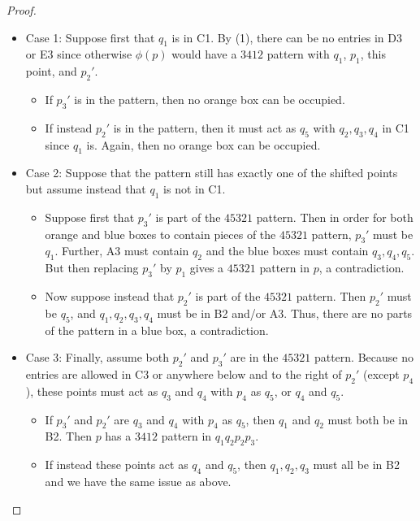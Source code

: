 \documentclass[10pt,a4paper]{amsart}
\begin{document}
\begin{proof}
    \begin{itemize}
        \item Case 1: Suppose first that $q_1$ is in C1. By (1), there can be no entries in D3 or E3 since otherwise $\phi(p)$ would have a $3412$ pattern with $q_1$, $p_1$, this point, and $p_2'$.
        \begin{itemize}
            \item If $p_3'$ is in the pattern, then no orange box can be occupied. 
            \item If instead $p_2'$ is in the pattern, then it must act as $q_5$ with $q_2, q_3,q_4$ in C1 since $q_1$ is. Again, then no orange box can be occupied. 
        \end{itemize}
        \item Case 2: Suppose that the pattern still has exactly one of the shifted points but assume instead that $q_1$ is not in C1. 
        \begin{itemize}
            \item Suppose first that $p_3'$ is part of the $45321$ pattern. Then in order for both orange and blue boxes to contain pieces of the $45321$ pattern, $p_3'$ must be $q_1$. Further, A3 must contain $q_2$ and the blue boxes must contain $q_3,q_4,q_5$. But then replacing $p_3'$ by $p_1$ gives a $45321$ pattern in $p$, a contradiction.
            \item Now suppose instead that $p_2'$ is part of the $45321$ pattern. Then $p_2'$ must be $q_5$, and $q_1,q_2,q_3,q_4$ must be in B2 and/or A3. Thus, there are no parts of the pattern in a blue box, a contradiction. 
        \end{itemize}
        \item Case 3: Finally, assume both $p_2'$ and $p_3'$ are in the $45321$ pattern. Because no entries are allowed in C3 or anywhere below and to the right of $p_2'$ (except $p_4$), these points must act as $q_3$ and $q_4$ with $p_4$ as $q_5$, or $q_4$ and $q_5$.
        \begin{itemize}
            \item If $p_3'$ and $p_2'$ are $q_3$ and $q_4$ with $p_4$ as $q_5$, then $q_1$ and $q_2$ must both be in B2. Then $p$ has a $3412$ pattern in $q_1q_2p_2p_3$.
            \item If instead these points act as $q_4$ and $q_5$, then $q_1, q_2, q_3$ must all be in B2 and we have the same issue as above. 
        \end{itemize}
    \end{itemize}
    


\end{proof}
\end{document}
